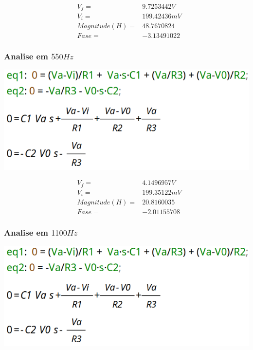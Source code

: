 \documentclass[12pt,twoside, a4paper, twocolumn]{article}
\begin{document}
\begin{equation*}
    \begin{aligned}
         & V_f =          & 9.7253442V  \\
         & V_i =          & 199.42436mV \\
         & Magnitude(H) = & 48.7670824  \\
         & Fase =         & -3.13491022
    \end{aligned}
\end{equation*}




\subsubsection{Analise em $550Hz$}




\begin{adjustbox}{scale=0.09}
    \includegraphics{eqs.png}
\end{adjustbox}




\begin{equation*}
    \begin{aligned}
         & V_f =          & 4.1496957V  \\
         & V_i =          & 199.35122mV \\
         & Magnitude(H) = & 20.8160035  \\
         & Fase =         & -2.01155708
    \end{aligned}
\end{equation*}




\subsubsection{Analise em $1100Hz$}




\begin{adjustbox}{scale=0.09}
    \includegraphics{eqs.png}
\end{adjustbox}
\end{document}
